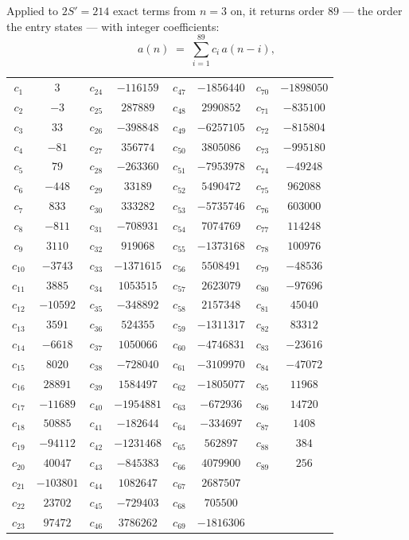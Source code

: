 \documentclass[11pt,a4paper]{article}
\theoremstyle{plain}
\theoremstyle{definition}
\begin{document}
Applied to $2S'=214$ exact terms from $n=3$ on, it returns order $89$ --- the
order the entry states --- with integer coefficients:
\[
a(n)\;=\;\sum_{i=1}^{89}c_i\,a(n-i),
\]
\begin{center}\small
\begin{tabular}{cccccccc}
$c_{1}$ & $3$ & $c_{24}$ & $-116159$ & $c_{47}$ & $-1856440$ & $c_{70}$ & $-1898050$ \\
$c_{2}$ & $-3$ & $c_{25}$ & $287889$ & $c_{48}$ & $2990852$ & $c_{71}$ & $-835100$ \\
$c_{3}$ & $33$ & $c_{26}$ & $-398848$ & $c_{49}$ & $-6257105$ & $c_{72}$ & $-815804$ \\
$c_{4}$ & $-81$ & $c_{27}$ & $356774$ & $c_{50}$ & $3805086$ & $c_{73}$ & $-995180$ \\
$c_{5}$ & $79$ & $c_{28}$ & $-263360$ & $c_{51}$ & $-7953978$ & $c_{74}$ & $-49248$ \\
$c_{6}$ & $-448$ & $c_{29}$ & $33189$ & $c_{52}$ & $5490472$ & $c_{75}$ & $962088$ \\
$c_{7}$ & $833$ & $c_{30}$ & $333282$ & $c_{53}$ & $-5735746$ & $c_{76}$ & $603000$ \\
$c_{8}$ & $-811$ & $c_{31}$ & $-708931$ & $c_{54}$ & $7074769$ & $c_{77}$ & $114248$ \\
$c_{9}$ & $3110$ & $c_{32}$ & $919068$ & $c_{55}$ & $-1373168$ & $c_{78}$ & $100976$ \\
$c_{10}$ & $-3743$ & $c_{33}$ & $-1371615$ & $c_{56}$ & $5508491$ & $c_{79}$ & $-48536$ \\
$c_{11}$ & $3885$ & $c_{34}$ & $1053515$ & $c_{57}$ & $2623079$ & $c_{80}$ & $-97696$ \\
$c_{12}$ & $-10592$ & $c_{35}$ & $-348892$ & $c_{58}$ & $2157348$ & $c_{81}$ & $45040$ \\
$c_{13}$ & $3591$ & $c_{36}$ & $524355$ & $c_{59}$ & $-1311317$ & $c_{82}$ & $83312$ \\
$c_{14}$ & $-6618$ & $c_{37}$ & $1050066$ & $c_{60}$ & $-4746831$ & $c_{83}$ & $-23616$ \\
$c_{15}$ & $8020$ & $c_{38}$ & $-728040$ & $c_{61}$ & $-3109970$ & $c_{84}$ & $-47072$ \\
$c_{16}$ & $28891$ & $c_{39}$ & $1584497$ & $c_{62}$ & $-1805077$ & $c_{85}$ & $11968$ \\
$c_{17}$ & $-11689$ & $c_{40}$ & $-1954881$ & $c_{63}$ & $-672936$ & $c_{86}$ & $14720$ \\
$c_{18}$ & $50885$ & $c_{41}$ & $-182644$ & $c_{64}$ & $-334697$ & $c_{87}$ & $1408$ \\
$c_{19}$ & $-94112$ & $c_{42}$ & $-1231468$ & $c_{65}$ & $562897$ & $c_{88}$ & $384$ \\
$c_{20}$ & $40047$ & $c_{43}$ & $-845383$ & $c_{66}$ & $4079900$ & $c_{89}$ & $256$ \\
$c_{21}$ & $-103801$ & $c_{44}$ & $1082647$ & $c_{67}$ & $2687507$ &  &  \\
$c_{22}$ & $23702$ & $c_{45}$ & $-729403$ & $c_{68}$ & $705500$ &  &  \\
$c_{23}$ & $97472$ & $c_{46}$ & $3786262$ & $c_{69}$ & $-1816306$ &  &  \\
\end{tabular}
\end{center}
\end{document}
